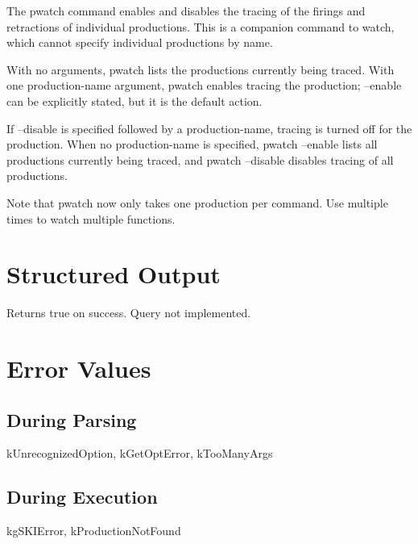 \documentclass[10pt]{article}
\begin{document}
 The pwatch command enables and disables the tracing of the firings and retractions of individual productions. This is a companion command to watch, which cannot specify individual productions by name. 


 With no arguments, pwatch lists the productions currently being traced. With one production-name argument, pwatch enables tracing the production; --enable can be explicitly stated, but it is the default action. 


 If --disable is specified followed by a production-name, tracing is turned off for the production. When no production-name is specified, pwatch --enable lists all productions currently being traced, and pwatch --disable disables tracing of all productions. 


 Note that pwatch now only takes one production per command. Use multiple times to watch multiple functions. 
\section*{ Structured Output }


 Returns true on success. Query not implemented. 
\section*{ Error Values }
\subsection*{ During Parsing }


 kUnrecognizedOption, kGetOptError, kTooManyArgs
\subsection*{ During Execution }


 kgSKIError, kProductionNotFound
\end{document}
